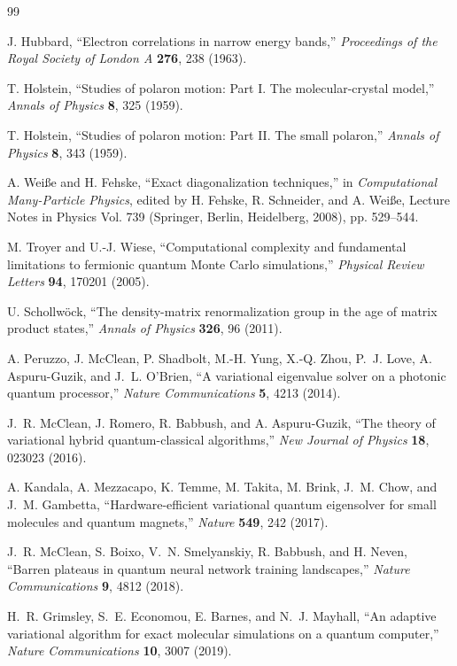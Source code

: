 \documentclass[
  reprint,
  amsmath,
  amssymb,
  aps,
  pra,
  nofootinbib,
  superscriptaddress,
  floatfix
]{revtex4-2}
\begin{document}
\begin{thebibliography}{99}

J. Hubbard,
``Electron correlations in narrow energy bands,''
\emph{Proceedings of the Royal Society of London A} \textbf{276}, 238 (1963).

T. Holstein,
``Studies of polaron motion: Part I. The molecular-crystal model,''
\emph{Annals of Physics} \textbf{8}, 325 (1959).

T. Holstein,
``Studies of polaron motion: Part II. The small polaron,''
\emph{Annals of Physics} \textbf{8}, 343 (1959).

A. Wei{\ss}e and H. Fehske,
``Exact diagonalization techniques,''
in \emph{Computational Many-Particle Physics},
edited by H. Fehske, R. Schneider, and A. Wei{\ss}e,
Lecture Notes in Physics Vol. 739 (Springer, Berlin, Heidelberg, 2008), pp. 529--544.

M. Troyer and U.-J. Wiese,
``Computational complexity and fundamental limitations to fermionic quantum Monte Carlo simulations,''
\emph{Physical Review Letters} \textbf{94}, 170201 (2005).

U. Schollw\"ock,
``The density-matrix renormalization group in the age of matrix product states,''
\emph{Annals of Physics} \textbf{326}, 96 (2011).

A. Peruzzo, J. McClean, P. Shadbolt, M.-H. Yung, X.-Q. Zhou, P.~J. Love, A. Aspuru-Guzik, and J.~L. O'Brien,
``A variational eigenvalue solver on a photonic quantum processor,''
\emph{Nature Communications} \textbf{5}, 4213 (2014).

J.~R. McClean, J. Romero, R. Babbush, and A. Aspuru-Guzik,
``The theory of variational hybrid quantum-classical algorithms,''
\emph{New Journal of Physics} \textbf{18}, 023023 (2016).

A. Kandala, A. Mezzacapo, K. Temme, M. Takita, M. Brink, J.~M. Chow, and J.~M. Gambetta,
``Hardware-efficient variational quantum eigensolver for small molecules and quantum magnets,''
\emph{Nature} \textbf{549}, 242 (2017).

J.~R. McClean, S. Boixo, V.~N. Smelyanskiy, R. Babbush, and H. Neven,
``Barren plateaus in quantum neural network training landscapes,''
\emph{Nature Communications} \textbf{9}, 4812 (2018).

H.~R. Grimsley, S.~E. Economou, E. Barnes, and N.~J. Mayhall,
``An adaptive variational algorithm for exact molecular simulations on a quantum computer,''
\emph{Nature Communications} \textbf{10}, 3007 (2019).


\end{thebibliography}
\end{document}

